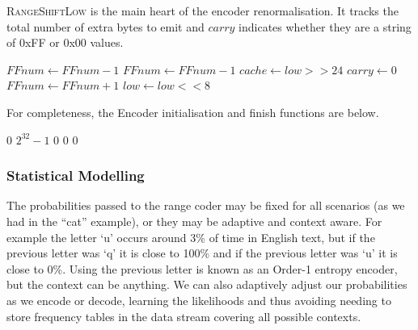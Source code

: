 \documentclass[a4paper]{article}
\begin{document}
\textsc{RangeShiftLow} is the main heart of the encoder renormalisation.
It tracks the total number of extra bytes to emit and $carry$ indicates whether they are a string of 0xFF or 0x00 values.

\begin{algorithmic}[1]
      \State {} 
        \State {}
        \State $FFnum \gets FFnum - 1$
      \EndWhile
    \Else
      \State {} 
        \State {}
        \State $FFnum \gets FFnum - 1$
      \EndWhile
    \EndIf
    \State $cache \gets low >> 24$ 
    \State $carry \gets 0$
  \Else
    \State $FFnum \gets FFnum + 1$
  \EndIf
  \Statex
  \State $low \gets low << 8$
\EndProcedure
\end{algorithmic}

For completeness, the Encoder initialisation and finish functions are below.

\begin{algorithmic}[1]
  \settowidth{\maxwidth}{FFnum\ }
  \State {} $0$
  \State {} $2^{32}-1$
  \State {} $0$
  \State {} $0$
  \State {} $0$
\EndProcedure
\end{algorithmic}

\begin{algorithmic}[1]
   
    \State {}
  \EndFor
\EndProcedure
\end{algorithmic}


\subsubsection*{Statistical Modelling}

The probabilities passed to the range coder may be fixed for all scenarios (as we had in the ``cat'' example), or they may be adaptive and context aware.
For example the letter `u' occurs around 3\% of time in English text, but if the previous letter was `q' it is close to 100\% and if the previous letter was `u' it is close to 0\%.
Using the previous letter is known as an Order-1 entropy encoder, but the context can be anything.
We can also adaptively adjust our probabilities as we encode or
decode, learning the likelihoods and thus avoiding needing to store
frequency tables in the data stream covering all possible contexts.
\end{document}
